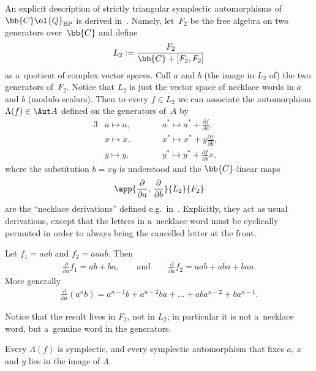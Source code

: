 An explicit description of strictly triangular symplectic automorphisms of \(\bb{C}\ol{Q}_{\mathrm{BP}}\)
is derived in~\cite{bp08}.
Namely, let~\(F_{2}\) be the free algebra on two generators over~\(\bb{C}\) and def\/ine
\begin{gather}
\label{eq:def-L2}
L_{2}\mathrel{:=}\frac{F_{2}}{\bb{C}+[F_{2},F_{2}]}
\end{gather}
as  a~quotient of complex vector spaces.
Call \(a\) and \(b\) (the image in \(L_{2}\) of) the two generators of~\(F_{2}\).
Notice that \(L_{2}\) is just the vector space of necklace words in \(a\) and \(b\) (modulo scalars).
Then to every \(f\in L_{2}\) we can associate the automorphism \(\Lambda(f)\in \Aut A\) def\/ined on the
generators of~\(A\) by
\begin{alignat*}{3}
& a\mapsto a, \qquad && a^{*}\mapsto a^{*}+\frac{\partial f}{\partial a}, &\\
& x\mapsto x, \qquad && x^{*}\mapsto x^{*}+y\frac{\partial f}{\partial b}, & \\
& y\mapsto y, \qquad && y^{*}\mapsto y^{*}+\frac{\partial f}{\partial b}x, &
\end{alignat*}
where the substitution \(b=xy\) is understood and the \(\bb{C}\)-linear maps
\begin{gather*}%
\app{\frac{\partial}{\partial a},\,\frac{\partial}{\partial b}}{L_{2}}{F_{2}}
\end{gather*}
are the ``necklace derivations'' def\/ined e.g.\ in~\cite{blb02, ginz01}.
Explicitly, they act as usual derivations, except that the letters in a~necklace word must be cyclically
permuted in order to always bring the cancelled letter at the front.

\begin{example}
Let $f_1=aab$ and $f_2=aaab$.
Then
\begin{gather*}
\frac{\partial}{\partial a}f_1=ab+ba,\qquad \text{and}\qquad \frac{\partial}{\partial a}f_2=aab+aba+baa.
\end{gather*}
More generally
\begin{gather*}
\frac{\partial}{\partial a}(a^{n}b)=a^{n-1}b+a^{n-2}ba+\dots+aba^{n-2}+ba^{n-1}.
\end{gather*}
\end{example}

Notice that the result lives in \(F_{2}\), not in \(L_{2}\); in particular it is not a~necklace word, but
a~genuine word in the generators.
\begin{theorem}
\label{teo:bp}
Every \(\Lambda(f)\) is symplectic, and every symplectic automorphism that fixes \(a\), \(x\) and \(y\)
lies in the image of \(\Lambda\).
\end{theorem}

